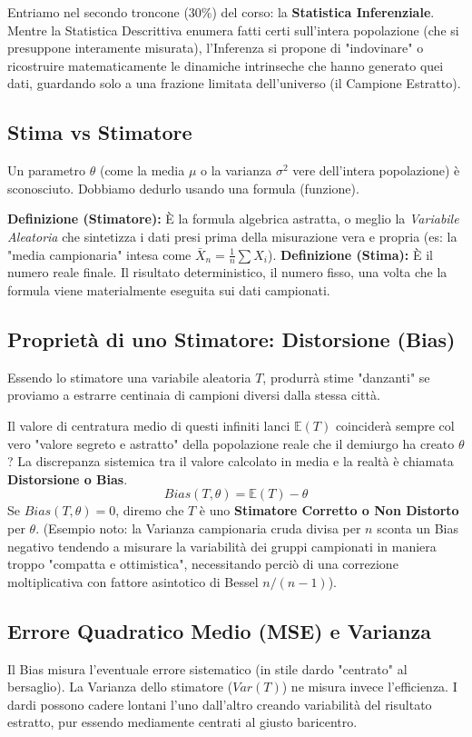 \documentclass[12pt, a4paper]{article}
\begin{document}
Entriamo nel secondo troncone (30\%) del corso: la \textbf{Statistica Inferenziale}.
Mentre la Statistica Descrittiva enumera fatti certi sull'intera popolazione (che si presuppone interamente misurata), l'Inferenza si propone di "indovinare" o ricostruire matematicamente le dinamiche intrinseche che hanno generato quei dati, guardando solo a una frazione limitata dell'universo (il Campione Estratto).

\subsection{Stima vs Stimatore}
Un parametro $\theta$ (come la media $\mu$ o la varianza $\sigma^2$ vere dell'intera popolazione) è sconosciuto. Dobbiamo dedurlo usando una formula (funzione).

\textbf{Definizione (Stimatore):} È la formula algebrica astratta, o meglio la \textit{Variabile Aleatoria} che sintetizza i dati presi prima della misurazione vera e propria (es: la "media campionaria" intesa come $\bar{X}_n = \frac{1}{n}\sum X_i$).
\textbf{Definizione (Stima):} È il numero reale finale. Il risultato deterministico, il numero fisso, una volta che la formula viene materialmente eseguita sui dati campionati.

\subsection{Proprietà di uno Stimatore: Distorsione (Bias)}
Essendo lo stimatore una variabile aleatoria $T$, produrrà stime "danzanti" se proviamo a estrarre centinaia di campioni diversi dalla stessa città. 

Il valore di centratura medio di questi infiniti lanci $\mathbb{E}(T)$ coinciderà sempre col vero "valore segreto e astratto" della popolazione reale che il demiurgo ha creato $\theta$?
La discrepanza sistemica tra il valore calcolato in media e la realtà è chiamata \textbf{Distorsione o Bias}.
$$ Bias(T, \theta) = \mathbb{E}(T) - \theta $$
Se $Bias(T, \theta) = 0$, diremo che $T$ è uno \textbf{Stimatore Corretto o Non Distorto} per $\theta$.
(Esempio noto: la Varianza campionaria cruda divisa per $n$ sconta un Bias negativo tendendo a misurare la variabilità dei gruppi campionati in maniera troppo "compatta e ottimistica", necessitando perciò di una correzione moltiplicativa con fattore asintotico di Bessel $n/(n-1)$).

\subsection{Errore Quadratico Medio (MSE) e Varianza}
Il Bias misura l'eventuale errore sistematico (in stile dardo "centrato" al bersaglio).
La Varianza dello stimatore ($Var(T)$) ne misura invece l'efficienza. I dardi possono cadere lontani l'uno dall'altro creando variabilità del risultato estratto, pur essendo mediamente centrati al giusto baricentro.
\end{document}
